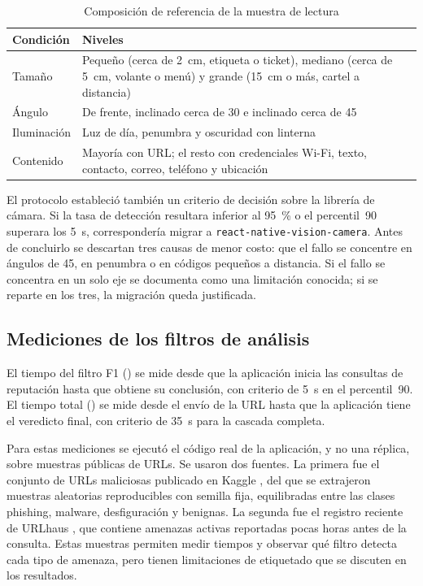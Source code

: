 \begin{table}[H]
	\centering
	\caption{Composición de referencia de la muestra de lectura}
	\label{tab:muestra}
	\begin{tabular}{@{}>{\raggedright\arraybackslash}p{2.8cm}>{\raggedright\arraybackslash}p{10.2cm}@{}}
		\toprule
		\textbf{Condición} & \textbf{Niveles} \\
		\midrule
		Tamaño & Pequeño (cerca de 2~cm, etiqueta o ticket), mediano (cerca de 5~cm, volante o menú) y grande (15~cm o más, cartel a distancia) \\
		Ángulo & De frente, inclinado cerca de 30\textdegree{} e inclinado cerca de 45\textdegree \\
		Iluminación & Luz de día, penumbra y oscuridad con linterna \\
		Contenido & Mayoría con URL; el resto con credenciales Wi-Fi, texto, contacto, correo, teléfono y ubicación \\
		\bottomrule
	\end{tabular}
\end{table}

El protocolo estableció también un criterio de decisión sobre la librería de cámara. Si la tasa de detección resultara inferior al 95~\% o el percentil~90 superara los 5~s, correspondería migrar a \texttt{react-native-vision-camera}. Antes de concluirlo se descartan tres causas de menor costo: que el fallo se concentre en ángulos de 45\textdegree, en penumbra o en códigos pequeños a distancia. Si el fallo se concentra en un solo eje se documenta como una limitación conocida; si se reparte en los tres, la migración queda justificada.

\subsection{Mediciones de los filtros de análisis}

El tiempo del filtro F1 (\tfuno) se mide desde que la aplicación inicia las consultas de reputación hasta que obtiene su conclusión, con criterio de 5~s en el percentil~90. El tiempo total (\ttotal) se mide desde el envío de la URL hasta que la aplicación tiene el veredicto final, con criterio de 35~s para la cascada completa.

Para estas mediciones se ejecutó el código real de la aplicación, y no una réplica, sobre muestras públicas de URLs. Se usaron dos fuentes. La primera fue el conjunto de URLs maliciosas publicado en Kaggle \cite{kaggle_maliciousurls}, del que se extrajeron muestras aleatorias reproducibles con semilla fija, equilibradas entre las clases phishing, malware, desfiguración y benignas. La segunda fue el registro reciente de URLhaus \cite{urlhaus_api}, que contiene amenazas activas reportadas pocas horas antes de la consulta. Estas muestras permiten medir tiempos y observar qué filtro detecta cada tipo de amenaza, pero tienen limitaciones de etiquetado que se discuten en los resultados.

